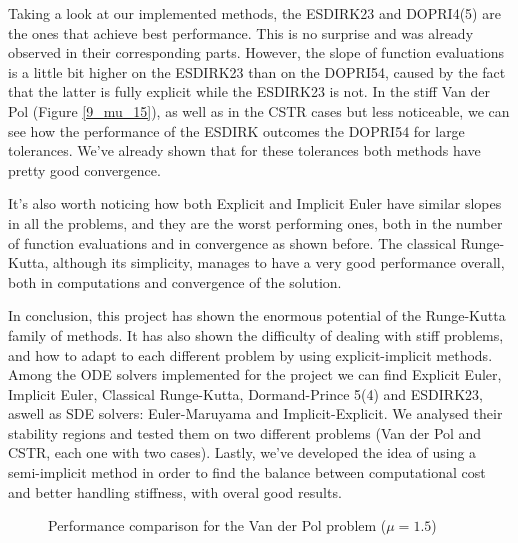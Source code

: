 Taking a look at our implemented methods, the ESDIRK23 and DOPRI4(5) are the ones that achieve best performance. This is no surprise and was already observed in their corresponding parts. However, the slope of function evaluations is a little bit higher on the ESDIRK23 than on the DOPRI54, caused by the fact that the latter is fully explicit while the ESDIRK23 is not. In the stiff Van der Pol (Figure \ref{9_mu_15}), as well as in the CSTR cases but less noticeable, we can see how the performance of the ESDIRK outcomes the DOPRI54 for large tolerances. We've already shown that for these tolerances both methods have pretty good convergence.

It's also worth noticing how both Explicit and Implicit Euler have similar slopes in all the problems, and they are the worst performing ones, both in the number of function evaluations and in convergence as shown before. The classical Runge-Kutta, although its simplicity, manages to have a very good performance overall, both in computations and convergence of the solution.

In conclusion, this project has shown the enormous potential of the Runge-Kutta family of methods. It has also shown the difficulty of dealing with stiff problems, and how to adapt to each different problem by using explicit-implicit methods. Among the ODE solvers implemented for the project we can find Explicit Euler, Implicit Euler, Classical Runge-Kutta, Dormand-Prince 5(4) and ESDIRK23, aswell as SDE solvers: Euler-Maruyama and Implicit-Explicit. We analysed their stability regions and tested them on two different problems (Van der Pol and CSTR, each one with two cases). Lastly, we've developed the idea of using a semi-implicit method in order to find the balance between computational cost and better handling stiffness, with overal good results.

\begin{figure}[H]
    \centering
    \caption{Performance comparison for the Van der Pol problem ($\mathit{\mu = 1.5}$)}
    \label{9_mu_1_5}
\end{figure}

